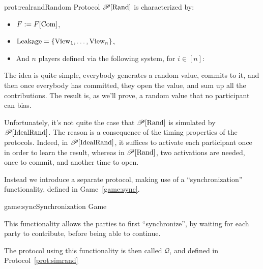 \begin{protocol}{prot:realrand}{Random Protocol}
$\mathscr{P}[\text{Rand}]$ is characterized by:
\begin{itemize}
    \item $F := F[\text{Com}]$,
    \item $\text{Leakage} = \{\text{View}_1, \ldots, \text{View}_n\}$,
    \item And $n$ players defined via the following system, for $i \in [n]$:
\end{itemize}
\end{protocol}

The idea is quite simple, everybody generates a random value,
commits to it, and then once everybody has committed, they open the value,
and sum up all the contributions.
The result is, as we'll prove, a random value that no participant
can bias.

Unfortunately, it's not quite the case that $\mathscr{P}[\text{Rand}]$
is simulated by $\mathscr{P}[\text{IdealRand}]$.
The reason is a consequence of the timing properties
of the protocols.
Indeed, in $\mathscr{P}[\text{IdealRand}]$, it suffices to activate
each participant once in order to learn the result,
whereas in $\mathscr{P}[\text{Rand}]$, two activations are needed,
once to commit, and another time to open.

Instead we introduce a separate protocol, making use of
a ``synchronization'' functionality, defined in Game~\ref{game:sync}.

\begin{game}{game:sync}{Synchronization Game}
\end{game}

This functionality allows the parties to first ``synchronize'',
by waiting for each party to contribute, before being able to continue.

The protocol using this functionality is then called $\mathscr{Q}$,
and defined in Protocol~\ref{prot:simrand}

